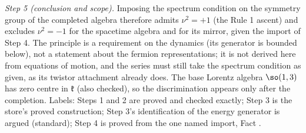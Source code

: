 \emph{Step 5 (conclusion and scope).} Imposing the spectrum condition on the symmetry group of the completed algebra therefore admits $\nu^{2} = +1$ (the Rule 1 ascent) and excludes $\nu^{2} = -1$ for the spacetime algebra and for its mirror, given the import of Step 4. The principle is a requirement on the dynamics (its generator is bounded below), not a statement about the fermion representations; it is not derived here from equations of motion, and the series must still take the spectrum condition as given, as its twistor attachment already does. The base Lorentz algebra $\so(1,3)$ has zero centre in $\mathfrak{k}$ (also checked), so the discrimination appears only after the completion. Labels: Steps 1 and 2 are proved and checked exactly; Step 3 is the store's proved construction; Step 3's identification of the energy generator is argued (standard); Step 4 is proved from the one named import, Fact .
